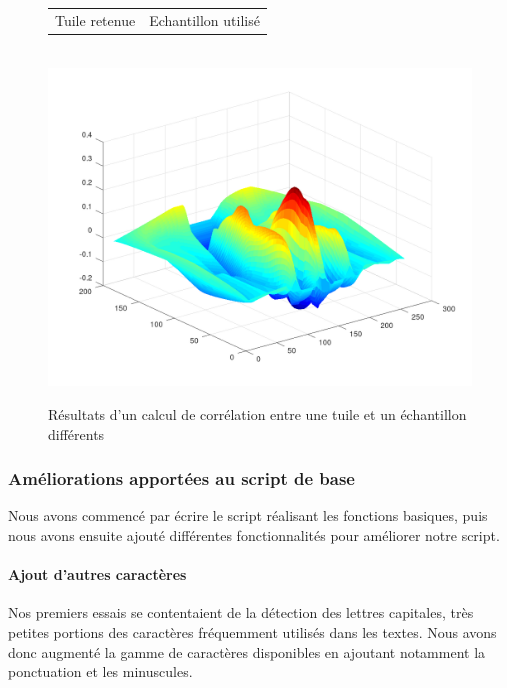 \documentclass[a4paper,12pt,titlepage]{report}
\begin{document}
\begin{figure}[h!]
\begin{center}
\begin{tabular}{cc}
			Tuile retenue & Echantillon utilisé		\\		
			\end{tabular}\\
			\includegraphics[scale=0.22]{../illus/2cor.png}
		\end{center}
		\vspace{-2em}
		\caption{Résultats d'un calcul de corrélation entre une tuile et un échantillon différents}
		\label{cor_dif}
	\end{figure}

	\subsubsection{Améliorations apportées au script de base}
	\vspace{-1em}
	Nous avons commencé par écrire le script réalisant les fonctions basiques, puis nous avons ensuite ajouté différentes fonctionnalités pour améliorer notre script.
	\vspace{-1em}
	\paragraph{Ajout d'autres caractères}
	Nos premiers essais se contentaient de la détection des lettres capitales, très petites portions des caractères fréquemment utilisés dans les textes. Nous avons donc augmenté la gamme de caractères disponibles en ajoutant notamment la ponctuation et les minuscules.	
\end{document}
